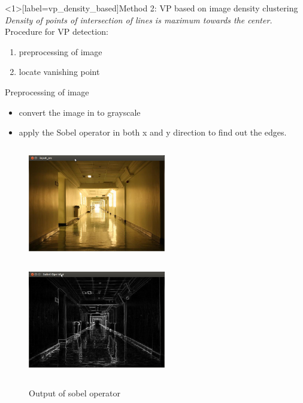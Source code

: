 \documentclass[8pt]{beamer}
\begin{document}
{{\fi

\begin{frame}<1>[label=vp_density_based]{Method 2: VP based on image density clustering}
\color[rgb]{0.59, 0.0, 0.09}\textit{Density of points of intersection of lines is maximum towards the center.}
Procedure for VP detection:
  \begin{enumerate}
    \setlength\itemsep{1em}
    \item \alert<2>{preprocessing of image}
    \item {}\alert<3>{locate vanishing point}
  \end{enumerate}

\end{frame}


\begin{frame}{Preprocessing of image}
\begin{itemize}
  \setlength\itemsep{1em}
 \item convert the image in to grayscale
 \item apply the Sobel operator in both x and y direction to find out the edges.
\end{itemize}
\begin{figure}
\includegraphics[width=6cm, height=5cm]{images/inputimage.png}%
\includegraphics[width=6cm, height=5cm]{images/sobelop.png}%
\caption{Output of sobel operator}%
\end{figure}
\end{frame}

}}
\end{document}
